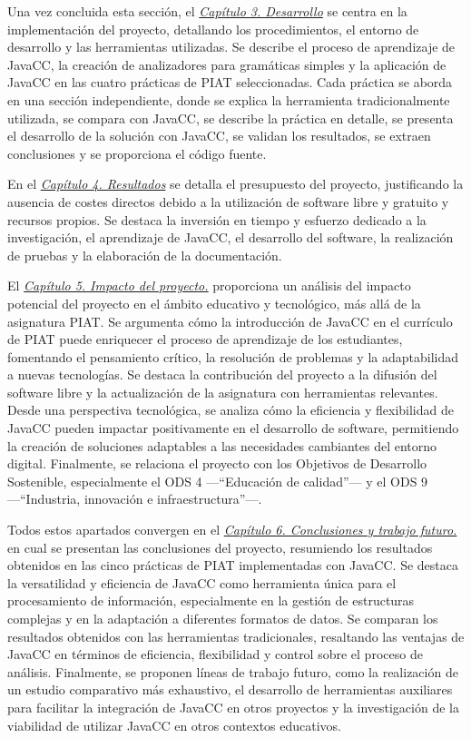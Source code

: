 Una vez concluida esta sección, el \hyperref[sec:cap3]{\textit{Capítulo 3. Desarrollo}} se centra en la implementación del proyecto, detallando los procedimientos, el entorno de desarrollo y las herramientas utilizadas. Se describe el proceso de aprendizaje de JavaCC, la creación de analizadores para gramáticas simples y la aplicación de JavaCC en las cuatro prácticas de PIAT seleccionadas. Cada práctica se aborda en una sección independiente, donde se explica la herramienta tradicionalmente utilizada, se compara con JavaCC, se describe la práctica en detalle, se presenta el desarrollo de la solución con JavaCC, se validan los resultados, se extraen conclusiones y se proporciona el código fuente.

En el \hyperref[sec:cap4]{\textit{Capítulo 4. Resultados}} se detalla el presupuesto del proyecto, justificando la ausencia de costes directos debido a la utilización de software libre y gratuito y recursos propios. Se destaca la inversión en tiempo y esfuerzo dedicado a la investigación, el aprendizaje de JavaCC, el desarrollo del software, la realización de pruebas y la elaboración de la documentación.

El \hyperref[sec:cap5]{\textit{Capítulo 5. Impacto del proyecto.}} proporciona un análisis del impacto potencial del proyecto en el ámbito educativo y tecnológico, más allá de la asignatura PIAT. Se argumenta cómo la introducción de JavaCC en el currículo de PIAT puede enriquecer el proceso de aprendizaje de los estudiantes, fomentando el pensamiento crítico, la resolución de problemas y la adaptabilidad a nuevas tecnologías. Se destaca la contribución del proyecto a la difusión del software libre y la actualización de la asignatura con herramientas relevantes. Desde una perspectiva tecnológica, se analiza cómo la eficiencia y flexibilidad de JavaCC pueden impactar positivamente en el desarrollo de software, permitiendo la creación de soluciones adaptables a las necesidades cambiantes del entorno digital. Finalmente, se relaciona el proyecto con los Objetivos de Desarrollo Sostenible, especialmente el ODS 4 ---``Educación de calidad''--- y el ODS 9 ---``Industria, innovación e infraestructura''---.

Todos estos apartados convergen en el \hyperref[sec:cap5]{\textit{Capítulo 6. Conclusiones y trabajo futuro.}} en cual se presentan las conclusiones del proyecto, resumiendo los resultados obtenidos en las cinco prácticas de PIAT implementadas con JavaCC. Se destaca la versatilidad y eficiencia de JavaCC como herramienta única para el procesamiento de información, especialmente en la gestión de estructuras complejas y en la adaptación a diferentes formatos de datos. Se comparan los resultados obtenidos con las herramientas tradicionales, resaltando las ventajas de JavaCC en términos de eficiencia, flexibilidad y control sobre el proceso de análisis. Finalmente, se proponen líneas de trabajo futuro, como la realización de un estudio comparativo más exhaustivo, el desarrollo de herramientas auxiliares para facilitar la integración de JavaCC en otros proyectos y la investigación de la viabilidad de utilizar JavaCC en otros contextos educativos.

